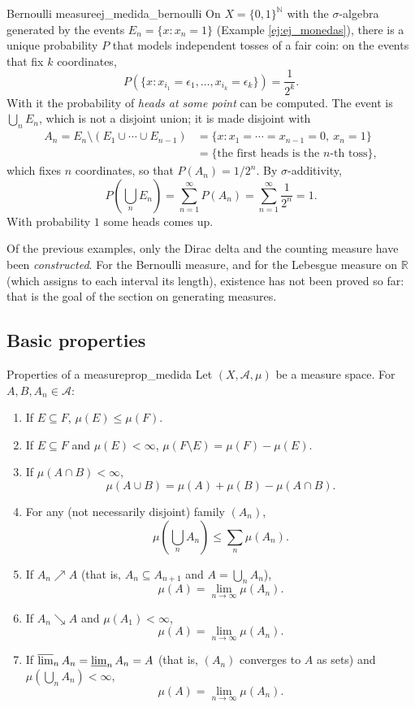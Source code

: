 \documentclass[11pt, a4paper]{article}
\begin{document}
\begin{ejemplo}{Bernoulli measure}{ej_medida_bernoulli}
On $X = \{0,1\}^{\mathbb{N}}$ with the $\sigma$-algebra generated by the events
$E_n = \{x : x_n = 1\}$ (Example \ref{ej:ej_monedas}), there is a unique probability $P$ that
models independent tosses of a fair coin: on the events that fix $k$
coordinates,
$$ P(\{x : x_{i_1} = \epsilon_1, \dots, x_{i_k} = \epsilon_k\}) = \frac{1}{2^k}. $$
With it the probability of \emph{heads at some point} can be computed. The event is
$\bigcup_n E_n$, which is not a disjoint union; it is made disjoint with
\begin{align*}
A_n = E_n \setminus (E_1 \cup \cdots \cup E_{n-1})
&= \{x : x_1 = \cdots = x_{n-1} = 0, \ x_n = 1\} \\
&= \{\text{the first heads is the } n\text{-th toss}\},
\end{align*}
which fixes $n$ coordinates, so that $P(A_n) = 1/2^n$. By $\sigma$-additivity,
$$ P\!\left(\bigcup_n E_n\right) = \sum_{n=1}^\infty P(A_n) = \sum_{n=1}^\infty \frac{1}{2^n}
= 1. $$
With probability $1$ some heads comes up.
\end{ejemplo}

\obs Of the previous examples, only the Dirac delta and the counting measure have been
\emph{constructed}. For the Bernoulli measure, and for the Lebesgue measure on $\mathbb{R}$
(which assigns to each interval its length), existence has not been proved so far: that is the
goal of the section on generating measures.

\subsection{Basic properties}

\begin{teorema}{Properties of a measure}{prop_medida}
Let $(X, \mathcal{A}, \mu)$ be a measure space. For $A, B, A_n \in \mathcal{A}$:
\begin{enumerate}
    \item If $E \subseteq F$, $\mu(E) \le \mu(F)$.
    \item If $E \subseteq F$ and $\mu(E) < \infty$, $\mu(F \setminus E) = \mu(F) - \mu(E)$.
    \item If $\mu(A \cap B) < \infty$,
    $$ \mu(A \cup B) = \mu(A) + \mu(B) - \mu(A \cap B). $$
    \item For any (not necessarily disjoint) family $(A_n)$,
    $$ \mu\!\left(\bigcup_n A_n\right) \le \sum_n \mu(A_n). $$
    \item If $A_n \nearrow A$ (that is, $A_n \subseteq A_{n+1}$ and $A = \bigcup_n A_n$),
    $$ \mu(A) = \lim_{n \to \infty} \mu(A_n). $$
    \item If $A_n \searrow A$ and $\mu(A_1) < \infty$,
    $$ \mu(A) = \lim_{n \to \infty} \mu(A_n). $$
    \item If $\varlimsup_n A_n = \varliminf_n A_n = A$ (that is, $(A_n)$ converges to $A$ as
    sets) and $\mu\!\left(\bigcup_n A_n\right) < \infty$,
    $$ \mu(A) = \lim_{n \to \infty} \mu(A_n). $$
\end{enumerate}
\end{teorema}
\end{document}
